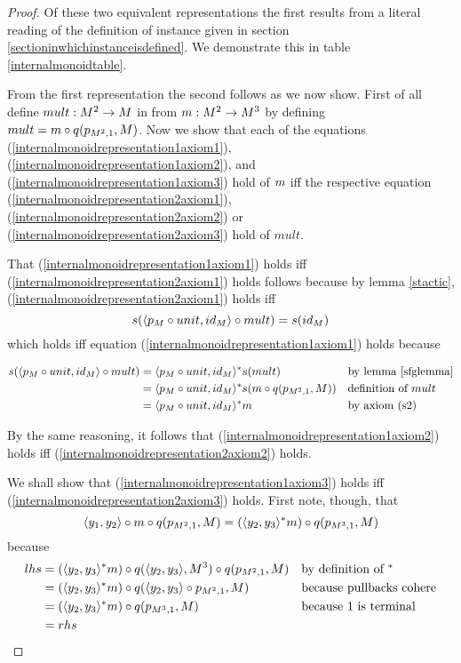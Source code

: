 \begin{proof}
Of these two equivalent representations the first results from a literal reading of the definition of instance 
given in section \ref{sectioninwhichinstanceisdefined}. We demonstrate this in table \ref{internalmonoidtable}. 

From the first representation the second follows as we now show.
First of all define $mult: M^2 \rightarrow M$ in \catcw from $m: M^2 \rightarrow M^3$ by defining
$mult = m \circ q(p_{M^2,1} , M)$. Now we show that each of the equations (\ref{internalmonoidrepresentation1axiom1}),
(\ref{internalmonoidrepresentation1axiom2}), and (\ref{internalmonoidrepresentation1axiom3}) hold of $m$ iff
the respective equation (\ref{internalmonoidrepresentation2axiom1}),
(\ref{internalmonoidrepresentation2axiom2}) or (\ref{internalmonoidrepresentation2axiom3}) hold of $mult$.

That (\ref{internalmonoidrepresentation1axiom1}) holds iff (\ref{internalmonoidrepresentation2axiom1}) holds follows
because by lemma \ref{stactic}, (\ref{internalmonoidrepresentation2axiom1}) holds iff
\begin{equation}
\label{equivalenceone}
s(\langle p_M \circ unit,id_M\rangle \circ mult) = s(id_M)
\end{equation}
which holds iff equation (\ref{internalmonoidrepresentation1axiom1}) holds because 

\begin{align*}
s(\langle p_M \circ unit,id_M\rangle\circ mult) &= \langle p_M \circ unit,id_M\rangle ^* s(mult )  && \mbox{by lemma \ref{sfglemma}} \\
             &= \langle p_M \circ unit,id_M\rangle ^* s(m \circ q(p_{M^2,1} , M)) && \mbox{definition of $mult$} \\
			       &= \langle p_M \circ unit,id_M\rangle ^* m                                &&  \mbox{by axiom (s2)}
\end{align*}

By the same reasoning, it follows that (\ref{internalmonoidrepresentation1axiom2}) holds iff (\ref{internalmonoidrepresentation2axiom2}) holds.

We shall show that (\ref{internalmonoidrepresentation1axiom3}) holds iff (\ref{internalmonoidrepresentation2axiom3}) holds.
First note, though, that
\begin{equation}
\label{thirdaxiomsubgoal}
 \langle y_1,y_2\rangle\circ m \circ q(p_{M^2,1} , M) = (\langle y_2,y_3\rangle^*m)\circ q(p_{M^3,1},M)
\end{equation}
because
\begin{align*}
lhs &= (\langle y_2,y_3\rangle^*m) \circ q(\langle y_2,y_3\rangle,M^3) \circ q(p_{M^2,1},M)  && \mbox{by definition of $^*$} \\
    &= (\langle y_2,y_3\rangle^*m) \circ q(\langle y_2,y_3\rangle \circ p_{M^2,1},M)         && \mbox{because pullbacks cohere} \\
    &= (\langle y_2,y_3\rangle^*m) \circ q(p_{M^3,1},M)                               && \mbox{because $1$ is terminal }\\
    &= rhs
\end{align*}


\end{proof}
